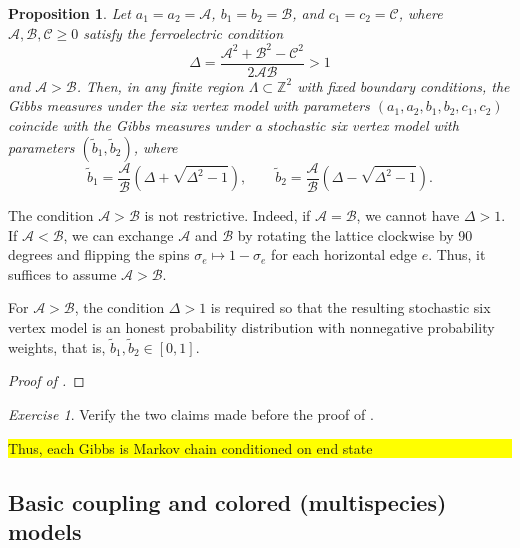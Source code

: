 \documentclass[letterpaper,11pt,oneside,reqno]{article}
\numberwithin{equation}{section}
\newtheorem{proposition}{Proposition}[section]
\theoremstyle{definition}
\theoremstyle{remark}
\newtheorem{exercise}{Exercise}[section]
\begin{document}
\begin{proposition}
	\label{prop:Aggarwal_lemma_Gibbs_property}
	Let $a_1=a_2=\mathscr{A}$, $b_1=b_2=\mathscr{B}$, and $c_1=c_2=\mathscr{C}$, where
	$\mathscr{A},\mathscr{B},\mathscr{C}\ge0$ satisfy the ferroelectric condition
	\begin{equation*}
		\Delta=\frac{\mathscr{A}^2+\mathscr{B}^2-\mathscr{C}^2}{2\mathscr{A}\mathscr{B}}>1
	\end{equation*}
	and $\mathscr{A}>\mathscr{B}$.
	Then, in any finite region $\Lambda\subset\mathbb{Z}^{2}$ with fixed boundary 
	conditions, the Gibbs measures under the six vertex model
	with parameters $(a_1,a_2,b_1,b_2,c_1,c_2)$
	coincide with the Gibbs measures
	under a stochastic six vertex model with parameters $(\tilde b_1,\tilde b_2)$,
	where 
	\begin{equation}
		\label{eq:Aggarwal_lemma_Gibbs_property_formulation}
		\tilde b_1=\frac{\mathscr{A}}{\mathscr{B}}\left( \Delta+\sqrt{\Delta^2-1} \right)
		,\qquad 
		\tilde b_2=\frac{\mathscr{A}}{\mathscr{B}}\left( \Delta-\sqrt{\Delta^2-1} \right).
	\end{equation}
\end{proposition}
The condition $\mathscr{A}>\mathscr{B}$ is not restrictive. Indeed, 
if $\mathscr{A}=\mathscr{B}$, we cannot have $\Delta>1$. 
If $\mathscr{A}<\mathscr{B}$, we can 
exchange $\mathscr{A}$ and $\mathscr{B}$ by
rotating the lattice clockwise by 90 degrees
and flipping the spins $\sigma_e\mapsto 1-\sigma_e$ for each horizontal edge $e$.
Thus, it suffices to assume $\mathscr{A}>\mathscr{B}$.

For $\mathscr{A}>\mathscr{B}$, the condition $\Delta>1$ is required
so that the resulting stochastic six vertex model
is an honest probability distribution with nonnegative probability weights, 
that is, $\tilde b_1,\tilde b_2\in[0,1]$.
\begin{proof}[Proof of ]
	
\end{proof}

\begin{exercise}
	Verify the two claims made before the 
	proof of .
\end{exercise}

\colorbox{yellow}{\parbox{.7\textwidth}{
Thus, each Gibbs is Markov chain conditioned on 
end state}}


\subsection{Basic coupling and colored (multispecies) models}
\label{sub:colored}
\end{document}
